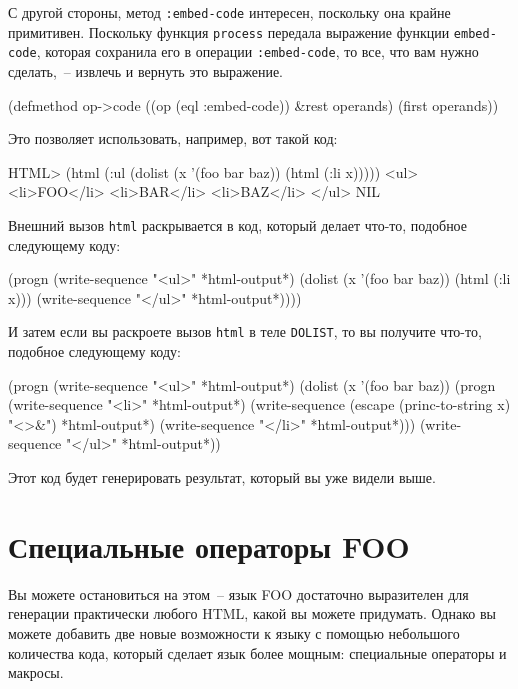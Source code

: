 С другой стороны, метод \lstinline{:embed-code} интересен, поскольку она крайне примитивен.
Поскольку функция \lstinline{process} передала выражение функции \lstinline{embed-code}, которая
сохранила его в операции \lstinline{:embed-code}, то все, что вам нужно сделать,~-- извлечь и
вернуть это выражение.

\begin{myverb}
(defmethod op->code ((op (eql :embed-code)) &rest operands)
  (first operands))
\end{myverb}

Это позволяет использовать, например, вот такой код:

\begin{myverb}
HTML> (html (:ul (dolist (x '(foo bar baz)) (html (:li x)))))
<ul>
  <li>FOO</li>
  <li>BAR</li>
  <li>BAZ</li>
</ul>
NIL
\end{myverb}

Внешний вызов \lstinline{html} раскрывается в код, который делает что-то, подобное следующему коду:

\begin{myverb}
(progn
  (write-sequence "<ul>" *html-output*)
  (dolist (x '(foo bar baz)) (html (:li x)))
  (write-sequence "</ul>" *html-output*))))
\end{myverb}

И затем если вы раскроете вызов \lstinline{html} в теле \lstinline{DOLIST}, то вы получите
что-то, подобное следующему коду:

\begin{myverb}
(progn
  (write-sequence "<ul>" *html-output*)
  (dolist (x '(foo bar baz))
    (progn
      (write-sequence "<li>" *html-output*)
      (write-sequence (escape (princ-to-string x) "<>&") *html-output*)
      (write-sequence "</li>" *html-output*)))
  (write-sequence "</ul>" *html-output*))
\end{myverb}

Этот код будет генерировать результат, который вы уже видели выше.

\section{Специальные операторы FOO}

Вы можете остановиться на этом~-- язык FOO достаточно выразителен для генерации
практически любого HTML, какой вы можете придумать.  Однако вы можете добавить две новые
возможности к языку с помощью небольшого количества кода, который сделает язык более
мощным: специальные операторы и макросы.


